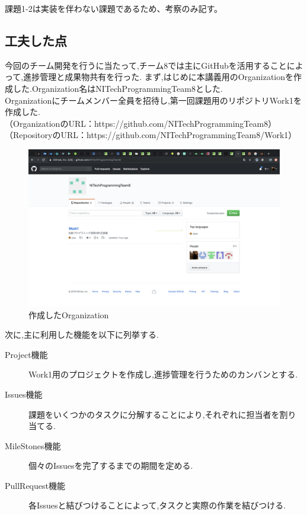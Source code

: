 \documentclass[uplatex,12pt]{jsarticle}
\begin{document}
課題1-2は実装を伴わない課題であるため、考察のみ記す。

\subsection{工夫した点}
今回のチーム開発を行うに当たって,チーム8では主にGitHubを活用することによって,進捗管理と成果物共有を行った.
まず,はじめに本講義用のOrganizationを作成した.Organization名はNITechProgrammingTeam8とした. \\
Organizationにチームメンバー全員を招待し,第一回課題用のリポジトリWork1を作成した. \\
（OrganizationのURL：https://github.com/NITechProgrammingTeam8）\\
（RepositoryのURL：https://github.com/NITechProgrammingTeam8/Work1）

\begin{figure}[!hbt]
  \centering
  \includegraphics[scale=0.20]{git_image/organization_image.png}
  \caption{作成したOrganization}
\end{figure}

\newpage

次に,主に利用した機能を以下に列挙する. \\
\begin{description}
  \item[Project機能] Work1用のプロジェクトを作成し,進捗管理を行うためのカンバンとする.
  \item[Issues機能] 課題をいくつかのタスクに分解することにより,それぞれに担当者を割り当てる.
  \item[MileStones機能] 個々のIssuesを完了するまでの期間を定める.
  \item[PullRequest機能] 各Issuesと結びつけることによって,タスクと実際の作業を結びつける.
\end{description}
\end{document}
